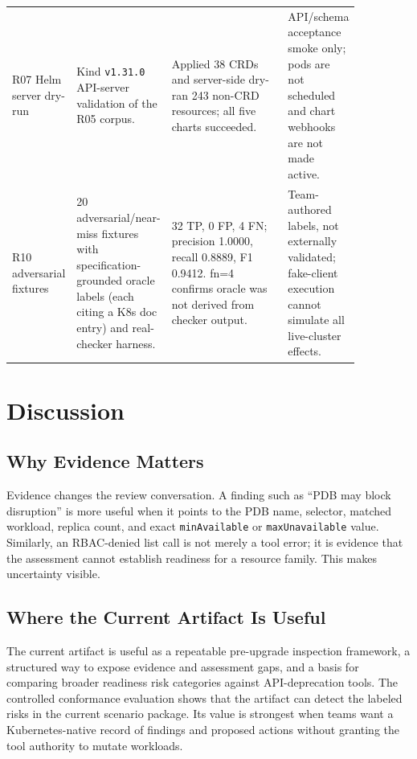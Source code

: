 \documentclass[10pt,journal]{IEEEtran}
\newcommand{\code}[1]{\texttt{#1}}
\begin{document}
\begin{table}[t]
\begin{tabular}{p{0.11\linewidth}p{0.21\linewidth}p{0.37\linewidth}p{0.17\linewidth}}
    R07 Helm server dry-run & Kind \code{v1.31.0} API-server validation of the R05 corpus. & Applied 38 CRDs and server-side dry-ran 243 non-CRD resources; all five charts succeeded. & API/schema acceptance smoke only; pods are not scheduled and chart webhooks are not made active. \\
    R10 adversarial fixtures & 20 adversarial/near-miss fixtures with specification-grounded oracle labels (each citing a K8s doc entry) and real-checker harness. & 32 TP, 0 FP, 4 FN; precision 1.0000, recall 0.8889, F1 0.9412. fn=4 confirms oracle was not derived from checker output. & Team-authored labels, not externally validated; fake-client execution cannot simulate all live-cluster effects. \\
    \bottomrule
  \end{tabular}
\end{table}

\section{Discussion}
\subsection{Why Evidence Matters}
Evidence changes the review conversation. A finding such as ``PDB may block disruption'' is more useful when it points to the PDB name, selector, matched workload, replica count, and exact \code{minAvailable} or \code{maxUnavailable} value. Similarly, an RBAC-denied list call is not merely a tool error; it is evidence that the assessment cannot establish readiness for a resource family. This makes uncertainty visible.

\subsection{Where the Current Artifact Is Useful}
The current artifact is useful as a repeatable pre-upgrade inspection framework, a structured way to expose evidence and assessment gaps, and a basis for comparing broader readiness risk categories against API-deprecation tools. The controlled conformance evaluation shows that the artifact can detect the labeled risks in the current scenario package. Its value is strongest when teams want a Kubernetes-native record of findings and proposed actions without granting the tool authority to mutate workloads.
\end{document}
